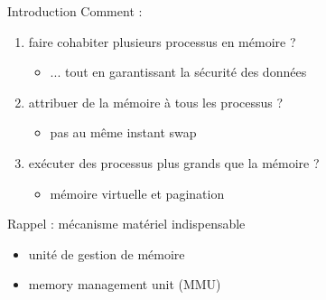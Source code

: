 \def\inc{inc5-mem}




\begin {frame} {Introduction}
    Comment :
    \begin {enumerate}
	\item faire cohabiter plusieurs processus en mémoire ?
	    \begin {itemize}
		\item ... tout en garantissant la sécurité des données
	    \end {itemize}
	\item attribuer de la mémoire à tous les processus ?
	    \begin {itemize}
		\item pas au même instant \implique swap
	    \end {itemize}
	\item exécuter des processus plus grands que la mémoire ?
	    \begin {itemize}
		\item mémoire virtuelle et pagination
	    \end {itemize}
    \end {enumerate}

    \vspace* {3mm}

    Rappel : mécanisme matériel indispensable
    \begin {itemize}
	\item unité de gestion de mémoire
	\item memory management unit (MMU)
    \end {itemize}
\end {frame}



